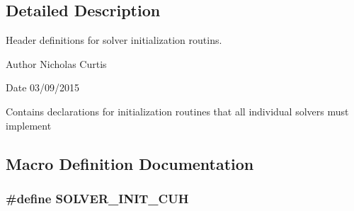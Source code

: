 \subsection{Detailed Description}
Header definitions for solver initialization routins. 

\begin{DoxyAuthor}{Author}
Nicholas Curtis 
\end{DoxyAuthor}
\begin{DoxyDate}{Date}
03/09/2015
\end{DoxyDate}
Contains declarations for initialization routines that all individual solvers must implement 

\subsection{Macro Definition Documentation}
\subsubsection[{\texorpdfstring{S\+O\+L\+V\+E\+R\+\_\+\+I\+N\+I\+T\+\_\+\+C\+UH}{SOLVER_INIT_CUH}}]{\setlength{\rightskip}{0pt plus 5cm}\#define S\+O\+L\+V\+E\+R\+\_\+\+I\+N\+I\+T\+\_\+\+C\+UH}\hypertarget{solver__init_8cuh_a6476a3e2130c9d369a9f7f65aaf5721e}{}\label{solver__init_8cuh_a6476a3e2130c9d369a9f7f65aaf5721e}
